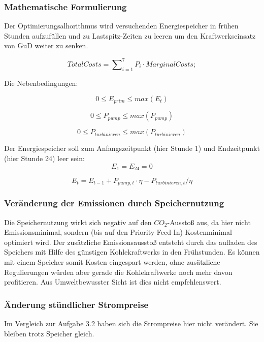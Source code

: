 \documentclass{eegreport}
\begin{document}
\subsubsection{Mathematische Formulierung}


Der Optimierungsalhorithmus wird versuchenden Energiespeicher in frühen Stunden aufzufüllen und zu Lastspitz-Zeiten zu leeren um 
den Kraftwerkseinsatz von GuD weiter zu senken.

\begin{equation}
TotalCosts = \sum\nolimits_{i=1}^7 P_i \cdot MarginalCosts;
\end{equation}


Die Nebenbedingungen:

\begin{equation}
0 \leq E_{prim}  \leq max(E_t)
\end{equation}

\begin{equation}
0 \leq P_{pump}  \leq max(P_{pump})
\end{equation}

\begin{equation}
0 \leq P_{turbinieren}  \leq max(P_{turbinieren})
\end{equation}

Der Energiespeicher soll zum Anfangszeitpunkt (hier Stunde 1) und Endzeitpunkt (hier Stunde 24) leer sein:
\begin{equation}
E_1=E_{24}=0
\end{equation}

\begin{equation}
E_t= E_{t-1} + P_{pump,t} \cdot \eta - P_{turbinieren,t}/ \eta
\end{equation}

 
\subsubsection{Veränderung der Emissionen durch Speichernutzung}
Die Speichernutzung wirkt sich negativ auf den $CO_2$-Ausstoß aus, da hier nicht Emissionsminimal, sondern (bis auf den Priority-Feed-In) Kostenminimal optimiert wird. Der zusätzliche Emissionsausstoß entsteht durch das aufladen des Speichers mit Hilfe des günstigen Kohlekraftwerks in den Frühstunden.
Es können mit einem Speicher somit Kosten eingespart werden, ohne zusätzliche Regulierungen würden aber gerade die Kohlekraftwerke noch mehr davon profitieren. 
Aus Umweltbewusster Sicht ist dies nicht empfehlenswert.


\subsubsection{Änderung stündlicher Strompreise}
Im Vergleich zur Aufgabe 3.2 haben sich die Strompreise hier nicht verändert. Sie bleiben trotz Speicher gleich.
\end{document}
